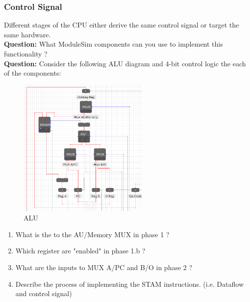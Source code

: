 \documentclass[a4paper, 11pt]{article}
\begin{document}
\subsubsection{Control Signal}
Different stages of the CPU either derive the same control signal or target the same hardware. \\
\textbf{Question:} What ModuleSim components can you use to implement this functionality ? \\
\textbf{Question:} Consider the following ALU diagram and 4-bit control logic the each of the components:
\begin{figure}[H]
    \centering
    \includegraphics[width =0.57\textwidth]{Images/Screenshot from 2022-12-14 16-40-47.png}
    \caption{ALU}
    \label{fig:demux}
    \end{figure}
\begin{enumerate}
    \item What is the to the AU/Memory MUX in phase 1  ?
    \item Which register are "enabled" in phase 1.b ?
    \item What are the inputs to MUX A/PC and B/O in phase 2 ? 
    \item Describe the process of implementing the STAM instructions. (i.e. Dataflow and control signal)
\end{enumerate}
%
\end{document}
